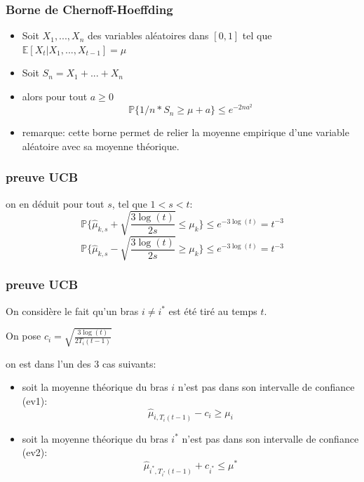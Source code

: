 \documentclass{beamer}
\begin{document}
\begin{frame}
    \frametitle{Borne de Chernoff-Hoeffding}
    \begin{itemize}
        \item Soit $X_1,...,X_n$ des variables aléatoires dans $[0,1]$ tel que $\mathbb{E}[X_t|X_1,...,X_{t-1}]=\mu$
        \item Soit $S_n = X_1 + ... + X_n$
        \item alors pour tout $a\ge0$
            $$\mathbb{P}\{1/n*S_n \ge \mu + a\} \le e^{-2na^2} $$
        \item remarque: cette borne permet de relier la moyenne empirique d'une variable aléatoire avec sa moyenne théorique.
    \end{itemize}
    
\end{frame}

\begin{frame}
    \frametitle{preuve UCB}
    on en déduit pour tout $s$, tel que $1<s<t$:
    $$\mathbb{P}\{ \hat{\mu}_{k,s} + \sqrt{\frac{3\log(t)}{2s}} \le \mu_k\} \le e^{-3\log(t)} = t^{-3} $$
    $$\mathbb{P}\{ \hat{\mu}_{k,s} - \sqrt{\frac{3\log(t)}{2s}} \ge \mu_k\} \le e^{-3\log(t)} = t^{-3} $$
    
\end{frame}

\begin{frame}
    \frametitle{preuve UCB}
    

    On considère le fait qu'un bras $i \ne i^*$ est été tiré au temps $t$.

    On pose $c_i=\sqrt{\frac{3\log(t)}{2T_i(t-1)}}$

    on est dans l'un des 3 cas suivants: 
    \begin{itemize}
        \item soit la moyenne théorique du bras $i$ n'est pas dans son intervalle de confiance (ev1):
            $$\hat{\mu}_{i,T_i(t-1)} - c_i \ge \mu_i $$

        \item soit la moyenne théorique du bras $i^*$ n'est pas dans son intervalle de confiance (ev2):
            $$\hat{\mu}_{i^*,T_{i^*}(t-1)} + c_{i^*} \le \mu^* $$

    \end{itemize}

\end{frame}
\end{document}
